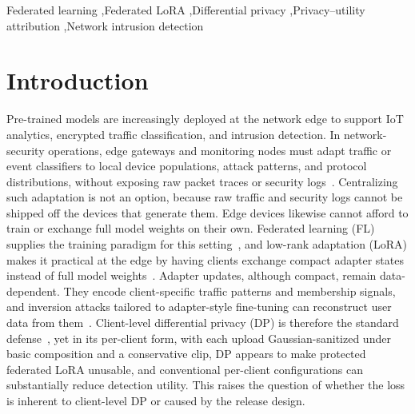 \documentclass[a4paper,fleqn]{cas-dc}
\begin{document}
\begin{keywords}
Federated learning \sep Federated LoRA \sep Differential privacy \sep Privacy--utility attribution \sep Network intrusion detection
\end{keywords}
\begin{NoHyper}
\maketitle
\end{NoHyper}
\section{Introduction}
\label{sec:introduction}
\par
Pre-trained models are increasingly deployed at the network edge to support IoT analytics, encrypted traffic classification, and intrusion detection. In network-security operations, edge gateways and monitoring nodes must adapt traffic or event classifiers to local device populations, attack patterns, and protocol distributions, without exposing raw packet traces or security logs~\cite{qu2025mobileedge}. Centralizing such adaptation is not an option, because raw traffic and security logs cannot be shipped off the devices that generate them. Edge devices likewise cannot afford to train or exchange full model weights on their own. Federated learning (FL) supplies the training paradigm for this setting~\cite{mcmahan2017communication,li2020federated}, and low-rank adaptation (LoRA) makes it practical at the edge by having clients exchange compact adapter states instead of full model
weights~\cite{hu2022lora,sun2024ffalora,singhal2025fedexlora}.
Adapter updates, although compact, remain data-dependent. They encode client-specific traffic patterns and membership signals, and inversion attacks tailored to adapter-style fine-tuning can reconstruct user data from them~\cite{sami2025adapter}. Client-level differential privacy (DP) is
therefore the standard defense~\cite{dwork2014algorithmic,abadi2016deep}, yet in its per-client form, with each upload Gaussian-sanitized under basic composition and a conservative clip, DP appears to make protected federated LoRA unusable, and conventional per-client configurations can substantially reduce detection utility. This raises the question of whether the loss is inherent to client-level DP or caused by the release design.
\par
\end{document}
